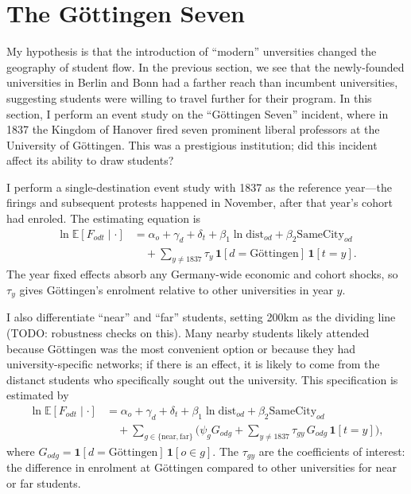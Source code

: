 \documentclass[11pt]{article}
\begin{document}
\section{The Göttingen Seven}

My hypothesis is that the introduction of ``modern'' unversities changed the geography of student flow. In the previous section, we see that the newly-founded universities in Berlin and Bonn had a farther reach than incumbent universities, suggesting students were willing to travel further for their program. In this section, I perform an event study on the ``G\"ottingen Seven'' incident, where in 1837 the Kingdom of Hanover fired seven prominent liberal professors at the University of G\"ottingen. This was a prestigious institution; did this incident affect its ability to draw students?

I perform a single-destination event study with 1837 as the reference year---the firings and subsequent protests happened in November, after that year's cohort had enroled. The estimating equation is
\begin{equation}
\begin{split}
\ln \mathbb{E}\!\left[F_{odt} \mid \cdot\right]
  &= \alpha_o + \gamma_d + \delta_t
   + \beta_1 \ln \mathrm{dist}_{od}
   + \beta_2 \mathrm{SameCity}_{od} \\
  &\quad + \sum_{y \neq 1837} \tau_y \,
     \mathbf{1}[d = \text{Göttingen}] \, \mathbf{1}[t = y].
\end{split}
\label{eq:got7_event}
\end{equation}
The year fixed effects absorb any Germany-wide economic and cohort shocks, so $\tau_y$ gives G\"ottingen's enrolment relative to other universities in year $y$.

I also differentiate ``near'' and ``far'' students, setting 200km as the dividing line (TODO: robustness checks on this). Many nearby students likely attended because G\"ottingen was the most convenient option or because they had university-specific networks; if there is an effect, it is likely to come from the distanct students who specifically sought out the university. This specification is estimated by
\begin{equation}
\begin{split}
\ln \mathbb{E}\!\left[F_{odt} \mid \cdot\right]
  &= \alpha_o + \gamma_d + \delta_t
   + \beta_1 \ln \mathrm{dist}_{od}
   + \beta_2 \mathrm{SameCity}_{od} \\
  &\quad + \sum_{g \in \{\text{near}, \text{far}\}}
     \Big( \psi_g G_{odg}
     + \sum_{y \neq 1837} \tau_{gy} \, G_{odg} \, \mathbf{1}[t = y] \Big),
\end{split}
\label{eq:got7_heterogeneity}
\end{equation}
where $G_{odg} = \mathbf{1}[d = \text{Göttingen}] \, \mathbf{1}[o \in g]$. The $\tau_{gy}$ are the coefficients of interest: the difference in enrolment at G\"ottingen compared to other universities for near or far students.
\end{document}
